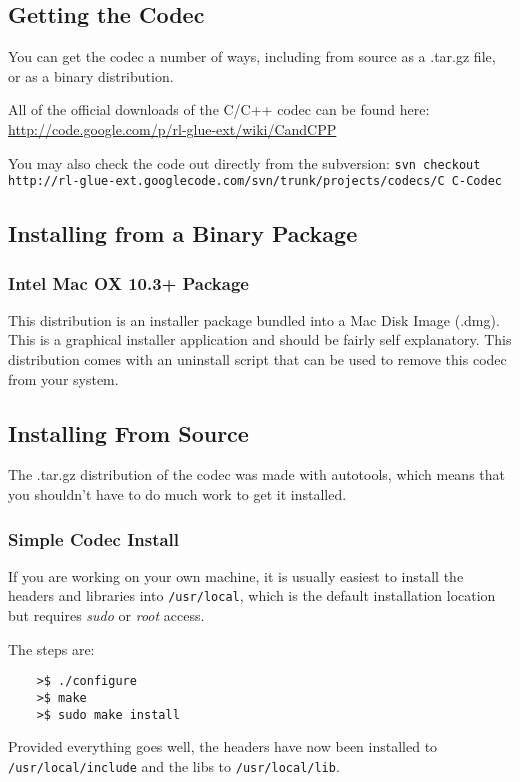 \documentclass[11pt]{article}
\begin{document}
\subsection{Getting the Codec}
You can get the codec a number of ways, including from source as a .tar.gz file, or as a binary distribution.

All of the official downloads of the C/C++ codec can be found here:\newline
\url{http://code.google.com/p/rl-glue-ext/wiki/CandCPP}

You may also check the code out directly from the subversion:
\newline
\texttt{svn checkout http://rl-glue-ext.googlecode.com/svn/trunk/projects/codecs/C C-Codec}

\subsection{Installing from a Binary Package}
\subsubsection{Intel Mac OX 10.3+ Package}
This distribution is an installer package bundled into a Mac Disk Image (.dmg).  This is a graphical installer application and should be fairly self explanatory. This distribution comes with an uninstall script that can be used to remove this codec from your system.

\subsection{Installing From Source}
The .tar.gz distribution of the codec was made with autotools, which means that you shouldn't have to do much work to get it installed.  

\subsubsection{Simple Codec Install}
If you are working on your own machine, it is usually easiest to install the headers and libraries into \texttt{/usr/local}, which is the default installation location but requires \textit{sudo} or \textit{root} access.

The steps are:
\begin{verbatim}
	>$ ./configure
	>$ make
	>$ sudo make install
\end{verbatim}

Provided everything goes well, the headers have now been installed to \texttt{/usr/local/include} and the libs to \texttt{/usr/local/lib}.
\end{document}
